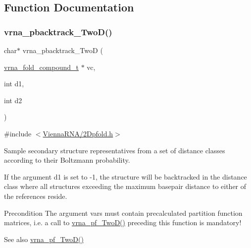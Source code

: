 \subsection{Function Documentation}
\mbox{\label{group__kl__neighborhood__stochbt_ga14aceef73f83bbde77bb3a0ca06c9d13}} 
\subsubsection{\texorpdfstring{vrna\_pbacktrack\_TwoD()}{vrna\_pbacktrack\_TwoD()}}
{\footnotesize\ttfamily char$\ast$ vrna\+\_\+pbacktrack\+\_\+\+TwoD (\begin{DoxyParamCaption}\item[{\mbox{\hyperlink{group__fold__compound_ga1b0cef17fd40466cef5968eaeeff6166}{vrna\+\_\+fold\+\_\+compound\+\_\+t}} $\ast$}]{vc,  }\item[{int}]{d1,  }\item[{int}]{d2 }\end{DoxyParamCaption})}



{\ttfamily \#include $<$\mbox{\hyperlink{2Dpfold_8h}{Vienna\+R\+N\+A/2\+Dpfold.\+h}}$>$}



Sample secondary structure representatives from a set of distance classes according to their Boltzmann probability. 

If the argument \textquotesingle{}d1\textquotesingle{} is set to \textquotesingle{}-\/1\textquotesingle{}, the structure will be backtracked in the distance class where all structures exceeding the maximum basepair distance to either of the references reside.

\begin{DoxyPrecond}{Precondition}
The argument \textquotesingle{}vars\textquotesingle{} must contain precalculated partition function matrices, i.\+e. a call to \mbox{\hyperlink{group__kl__neighborhood__pf_ga0bc3427689bd09da09b8b3094a27f836}{vrna\+\_\+pf\+\_\+\+Two\+D()}} preceding this function is mandatory!
\end{DoxyPrecond}
\begin{DoxySeeAlso}{See also}
\mbox{\hyperlink{group__kl__neighborhood__pf_ga0bc3427689bd09da09b8b3094a27f836}{vrna\+\_\+pf\+\_\+\+Two\+D()}}
\end{DoxySeeAlso}

